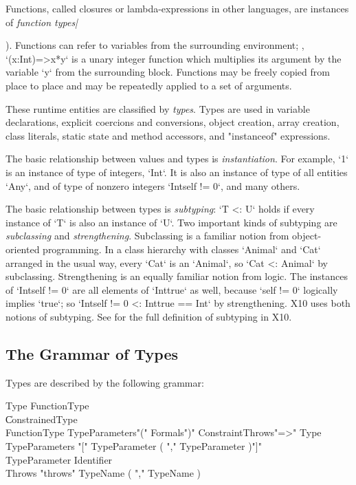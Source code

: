 Functions, called closures or lambda-expressions in other languages, are
instances of {\em function types|} {). Functions can refer to
variables from the surrounding environment; \eg, \xcd`(x:Int)=>x*y` is a unary
integer function which multiplies its argument by the variable \xcd`y` from
the surrounding block.  
Functions may be freely copied from place to place and may be repeatedly
applied to a set of arguments.

These runtime entities are classified by {\em types}. Types are used in
variable declarations, explicit coercions and conversions, object creation,
array creation, class literals, static state and method accessors, and
\xcd"instanceof" expressions.

The basic relationship between values and types is {\em instantiation}. For
example, \xcd`1` is an instance of type of integers, \xcd`Int`. It is also an
instance of type of all entities \xcd`Any`, and of type of nonzero integers
\xcd`Int{self != 0}`, and many others.

The basic relationship between types is {\em subtyping}: \xcd`T <: U` holds if
every instance of \xcd`T` is also an instance of \xcd`U`. Two important kinds
of subtyping are {\em subclassing} and {\em strengthening}.  Subclassing is a
familiar notion from object-oriented programming.  In a class
hierarchy with classes \xcd`Animal` and \xcd`Cat` arranged in the usual way,
every \xcd`Cat` is an \xcd`Animal`, so \xcd`Cat <: Animal` by subclassing.  
Strengthening is an equally familiar notion from logic.   The instances of
\xcd`Int{self != 0}` are all elements of \xcd`Int{true}` as well, because
\xcd`self != 0` logically implies \xcd`true`; so 
\xcd`Int{self != 0} <: Int{true} == Int` by strengthening.  X10 uses both
notions of subtyping.  See  for the full definition
of subtyping in X10.




\subsection*{The Grammar of Types}

Types are described by the following grammar: 
\begin{grammar}
Type \: FunctionType \\
    \| ConstrainedType  \\

FunctionType \: TypeParameters\opt \xcd"(" Formals\opt \xcd")"
Constraint\opt Throws\opt \xcd"=>" Type \\
TypeParameters \: \xcd"[" TypeParameter ( \xcd"," TypeParameter )\star \xcd"]" \\
TypeParameter \: Identifier \\
Throws \: \xcd"throws" TypeName ( \xcd"," TypeName )\star \\


\end{grammar}}
